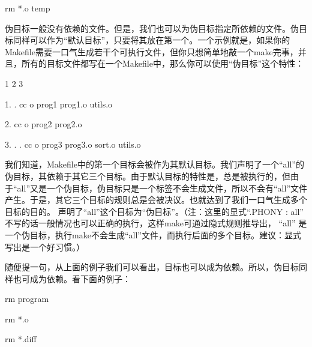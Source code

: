 \documentclass[a4paper,10pt]{sphinxmanual}
\begin{document}
\begin{sphinxVerbatim}[commandchars=\\\{\}]
 
    rm *.o temp
\end{sphinxVerbatim}

伪目标一般没有依赖的文件。但是，我们也可以为伪目标指定所依赖的文件。伪目标同样可以作为“默认目标”，只要将其放在第一个。一个示例就是，如果你的Makefile需要一口气生成若干个可执行文件，但你只想简单地敲一个make完事，并且，所有的目标文件都写在一个Makefile中，那么你可以使用“伪目标”这个特性：

\begin{sphinxVerbatim}[commandchars=\\\{\}]
 1 2 3
 

 1. .
    cc \PYGZhy{}o prog1 prog1.o utils.o

 2.
    cc \PYGZhy{}o prog2 prog2.o

 3. . .
    cc \PYGZhy{}o prog3 prog3.o sort.o utils.o
\end{sphinxVerbatim}

我们知道，Makefile中的第一个目标会被作为其默认目标。我们声明了一个“all”的伪目标，其依赖于其它三个目标。由于默认目标的特性是，总是被执行的，但由于“all”又是一个伪目标，伪目标只是一个标签不会生成文件，所以不会有“all”文件产生。于是，其它三个目标的规则总是会被决议。也就达到了我们一口气生成多个目标的目的。  声明了“all”这个目标为“伪目标”。（注：这里的显式“.PHONY : all” 不写的话一般情况也可以正确的执行，这样make可通过隐式规则推导出， “all” 是一个伪目标，执行make不会生成“all”文件，而执行后面的多个目标。建议：显式写出是一个好习惯。）

随便提一句，从上面的例子我们可以看出，目标也可以成为依赖。所以，伪目标同样也可成为依赖。看下面的例子：

\begin{sphinxVerbatim}[commandchars=\\\{\}]
   

  
    rm program

    rm *.o

    rm *.diff
\end{sphinxVerbatim}
\end{document}
